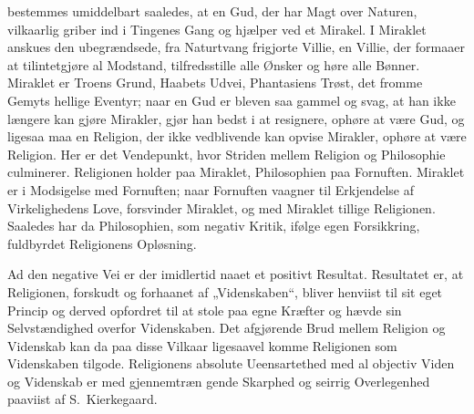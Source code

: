\documentclass[12pt]{book}
\begin{document}
bestemmes umiddelbart saaledes, at en Gud, der har Magt over
Naturen, vilkaarlig griber ind i Tingenes Gang og hjælper ved et
Mirakel. I Miraklet anskues den ubegrændsede, fra Naturtvang
frigjorte Villie, en Villie, der formaaer at tilintetgjøre al
Modstand, tilfredsstille alle Ønsker og høre alle Bønner. Miraklet
er Troens Grund, Haabets Udvei, Phantasiens Trøst, det fromme Gemyts
hellige Eventyr; naar en Gud er bleven saa gammel og svag, at han
ikke længere kan gjøre Mirakler, gjør han bedst i at resignere,
ophøre at være Gud, og ligesaa maa en Religion, der ikke
vedblivende kan opvise Mirakler, ophøre at være Religion. Her er det
Vendepunkt, hvor Striden mellem Religion og Philosophie culminerer.
Religionen holder paa Miraklet, Philosophien paa Fornuften. Miraklet
er i Modsigelse med Fornuften; naar Fornuften vaagner til
Erkjendelse af Virkelighedens Love, forsvinder Miraklet, og med
Miraklet tillige Religionen. Saaledes har da Philosophien, som
negativ Kritik, ifølge egen Forsikkring, fuldbyrdet Religionens
Opløsning.

Ad den negative Vei er der imidlertid naaet et positivt Resultat.
Resultatet er, at Religionen, forskudt og forhaanet af
„Videnskaben“, bliver henviist til sit eget Princip og derved
opfordret til at stole paa egne Kræfter og hævde sin Selvstændighed
overfor Videnskaben. Det afgjørende Brud mellem Religion og
Videnskab kan da paa disse Vilkaar ligesaavel komme Religionen som
Videnskaben tilgode. Religionens absolute Ueensartethed med al
objectiv Viden og Videnskab er med gjennemtræn\-
gende Skarphed og seirrig Overlegenhed paaviist af S.\ Kierkegaard.
\end{document}
